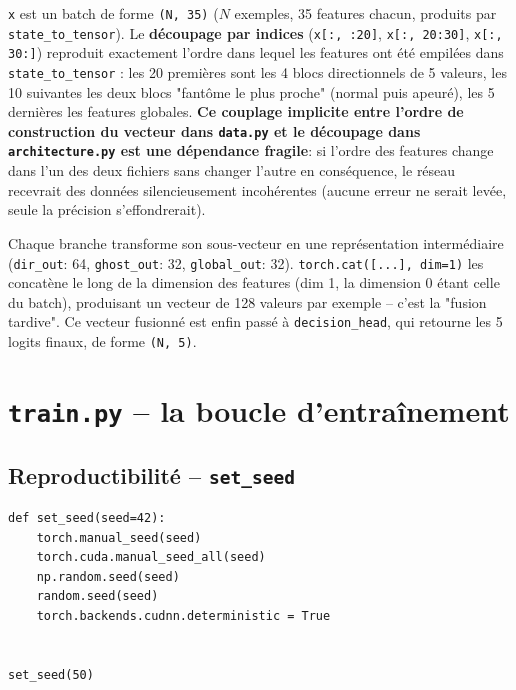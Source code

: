 \documentclass[a4paper,12pt]{article}
\begin{document}
\texttt{x} est un batch de forme \texttt{(N, 35)} ($N$ exemples, 35
features chacun, produits par \texttt{state\_to\_tensor}). Le
\textbf{découpage par indices} (\texttt{x[:, :20]},
\texttt{x[:, 20:30]}, \texttt{x[:, 30:]}) reproduit exactement l'ordre
dans lequel les features ont été empilées dans \texttt{state\_to\_tensor}
: les 20 premières sont les 4 blocs directionnels de 5 valeurs, les 10
suivantes les deux blocs "fantôme le plus proche" (normal puis apeuré),
les 5 dernières les features globales. \textbf{Ce couplage implicite
entre l'ordre de construction du vecteur dans \texttt{data.py} et le
découpage dans \texttt{architecture.py} est une dépendance fragile}: si
l'ordre des features change dans l'un des deux fichiers sans changer
l'autre en conséquence, le réseau recevrait des données silencieusement
incohérentes (aucune erreur ne serait levée, seule la précision
s'effondrerait).

Chaque branche transforme son sous-vecteur en une représentation
intermédiaire (\texttt{dir\_out}: 64, \texttt{ghost\_out}: 32,
\texttt{global\_out}: 32). \texttt{torch.cat([...], dim=1)} les concatène
le long de la dimension des features (dim 1, la dimension 0 étant celle
du batch), produisant un vecteur de 128 valeurs par exemple -- c'est la
"fusion tardive". Ce vecteur fusionné est enfin passé à
\texttt{decision\_head}, qui retourne les 5 logits finaux, de forme
\texttt{(N, 5)}.

\newpage
\section{\texttt{train.py} -- la boucle d'entraînement}

\subsection{Reproductibilité -- \texttt{set\_seed}}

\begin{lstlisting}
def set_seed(seed=42):
    torch.manual_seed(seed)
    torch.cuda.manual_seed_all(seed)
    np.random.seed(seed)
    random.seed(seed)
    torch.backends.cudnn.deterministic = True


set_seed(50)
\end{lstlisting}
\end{document}
